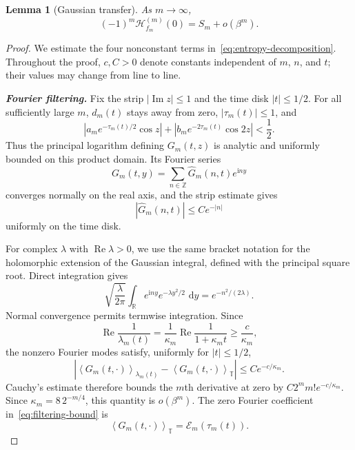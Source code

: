 \documentclass[10pt,letterpaper,journal]{IEEEtran}
\newcommand{\R}{\mathbb{R}}
\newcommand{\T}{\mathbb{T}}
\newcommand{\Z}{\mathbb{Z}}
\newcommand{\cH}{\mathcal{H}}
\newcommand{\cE}{\mathcal{E}}
\newcommand{\dd}{\,\mathrm{d}}
\newcommand{\ii}{\mathrm{i}}
\newcommand{\avgT}[1]{\left\langle #1\right\rangle_{\T}}
\newcommand{\avgG}[2]{\left\langle #1\right\rangle_{#2}}
\theoremstyle{plain}
\newtheorem{lemma}[theorem]{Lemma}
\theoremstyle{definition}
\begin{document}
\begin{lemma}[Gaussian transfer]
\label{lem:transfer}
As $m\to\infty$,
\begin{equation}
 (-1)^m\cH_{f_m}^{(m)}(0)=S_m+o(\beta^m).
 \label{eq:transfer}
\end{equation}
\end{lemma}

\begin{proof}
We estimate the four nonconstant terms in~\eqref{eq:entropy-decomposition}.
Throughout the proof, $c,C>0$ denote constants independent of $m$, $n$,
and $t$; their values may change from line to line.

\textbf{\textit{Fourier filtering.}}
Fix the strip $|\operatorname{Im}z|\le1$ and the time disk $|t|\le1/2$.
For all sufficiently large $m$, $d_m(t)$ stays away from zero,
$|\tau_m(t)|\le1$, and
\[
 \left|a_me^{-\tau_m(t)/2}\cos z\right|
 +\left|b_me^{-2\tau_m(t)}\cos2z\right|<\frac12.
\]
Thus the principal logarithm defining $G_m(t,z)$ is analytic and uniformly
bounded on this product domain. Its Fourier series
\[
 G_m(t,y)=\sum_{n\in\Z}\widehat G_m(n,t)e^{\ii ny}
\]
converges normally on the real axis, and the strip estimate gives
\begin{equation}
 |\widehat G_m(n,t)|\le Ce^{-|n|}
 \label{eq:Fourier-decay}
\end{equation}
uniformly on the time disk.

For complex $\lambda$ with $\operatorname{Re}\lambda>0$, we use the same
bracket notation for the holomorphic extension of the Gaussian integral,
defined with the principal square root. Direct integration gives
\[
 \sqrt{\frac{\lambda}{2\pi}}
 \int_{\R}e^{\ii ny}e^{-\lambda y^2/2}\,\dd y
 =e^{-n^2/(2\lambda)}.
\]
Normal convergence permits termwise integration. Since
\[
 \operatorname{Re}\frac1{\lambda_m(t)}
 =\frac1{\kappa_m}
 \operatorname{Re}\frac1{1+\kappa_mt}
 \ge\frac{c}{\kappa_m},
\]
the nonzero Fourier modes satisfy, uniformly for $|t|\le1/2$,
\begin{equation}
 \left|
 \avgG{G_m(t,\cdot)}{\lambda_m(t)}
 -\avgT{G_m(t,\cdot)}
 \right|
 \le Ce^{-c/\kappa_m}.
 \label{eq:filtering-bound}
\end{equation}
Cauchy's estimate therefore bounds the $m$th derivative at zero by
$C2^m m!e^{-c/\kappa_m}$. Since
$\kappa_m=8\,2^{-m/4}$, this quantity is $o(\beta^m)$. The zero Fourier
coefficient in~\eqref{eq:filtering-bound} is
\begin{equation}
 \avgT{G_m(t,\cdot)}=\cE_m(\tau_m(t)).
 \label{eq:zero-mode}
\end{equation}


\end{proof}
\end{document}
